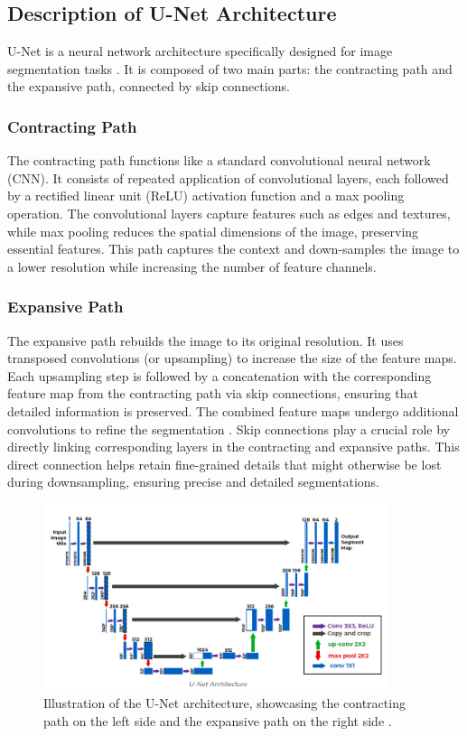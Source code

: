 \documentclass{ieeeaccess}
\begin{document}
\subsection{Description of U-Net Architecture}
U-Net is a neural network architecture specifically designed for image segmentation tasks \cite{ronneberger2015u}. It is composed of two main parts: the contracting path and the expansive path, connected by skip connections.
\subsubsection{Contracting Path}
The contracting path functions like a standard convolutional neural network (CNN). It consists of repeated application of convolutional layers, each followed by a rectified linear unit (ReLU) activation function and a max pooling operation. The convolutional layers capture features such as edges and textures, while max pooling reduces the spatial dimensions of the image, preserving essential features. This path captures the context and down-samples the image to a lower resolution while increasing the number of feature channels.
\subsubsection{Expansive Path}
The expansive path rebuilds the image to its original resolution. It uses transposed convolutions (or upsampling) to increase the size of the feature maps. Each upsampling step is followed by a concatenation with the corresponding feature map from the contracting path via skip connections, ensuring that detailed information is preserved. The combined feature maps undergo additional convolutions to refine the segmentation \cite{ronneberger2015u}.
Skip connections play a crucial role by directly linking corresponding layers in the contracting and expansive paths. This direct connection helps retain fine-grained details that might otherwise be lost during downsampling, ensuring precise and detailed segmentations.
\begin{figure} [!t]
    \centering 
    \includegraphics[width=0.9\textwidth]{figures/UNet.png}
\caption{Illustration of the U-Net architecture, showcasing the contracting path on the left side and the expansive path on the right side \cite{ronneberger2015u}.}
\label{fig:unet_architecture}
\end{figure}
\end{document}
